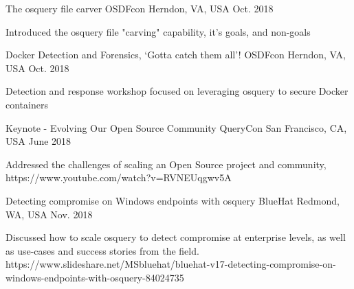 


\begin{cventries}


\cventry
{The osquery file carver} %
{OSDFcon} %
{Herndon, VA, USA} %
{Oct. 2018} %
{ %
\begin{cvitems}
\item {Introduced the osquery file "carving" capability, it's goals, and non-goals}
\end{cvitems}
}


\cventry
{Docker Detection and Forensics, ‘Gotta catch them all’!} %
{OSDFcon} %
{Herndon, VA, USA} %
{Oct. 2018} %
{ %
\begin{cvitems}
\item {Detection and response workshop focused on leveraging osquery to secure Docker containers}
\end{cvitems}
}


\cventry
{Keynote - Evolving Our Open Source Community} %
{QueryCon} %
{San Francisco, CA, USA} %
{June 2018} %
{ %
\begin{cvitems}
\item {Addressed the challenges of scaling an Open Source project and community, https://www.youtube.com/watch?v=RVNEUqgwv5A}
\end{cvitems}
}


\cventry
{Detecting compromise on Windows endpoints with osquery} %
{BlueHat} %
{Redmond, WA, USA} %
{Nov. 2018} %
{ %
\begin{cvitems}
\item {Discussed how to scale osquery to detect compromise at enterprise levels, as well as use-cases and success stories from the field. https://www.slideshare.net/MSbluehat/bluehat-v17-detecting-compromise-on-windows-endpoints-with-osquery-84024735}
\end{cvitems}
}


\end{cventries}
